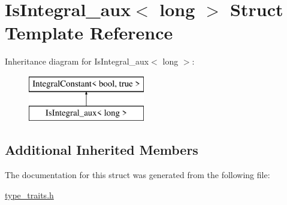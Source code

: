 \hypertarget{struct_is_integral__aux_3_01long_01_4}{}\section{Is\+Integral\+\_\+aux$<$ long $>$ Struct Template Reference}
\label{struct_is_integral__aux_3_01long_01_4}
Inheritance diagram for Is\+Integral\+\_\+aux$<$ long $>$\+:\begin{figure}[H]
\begin{center}
\leavevmode
\includegraphics[height=2.000000cm]{struct_is_integral__aux_3_01long_01_4}
\end{center}
\end{figure}
\subsection*{Additional Inherited Members}


The documentation for this struct was generated from the following file\+:\begin{DoxyCompactItemize}
\item 
\hyperlink{type__traits_8h}{type\+\_\+traits.\+h}\end{DoxyCompactItemize}
